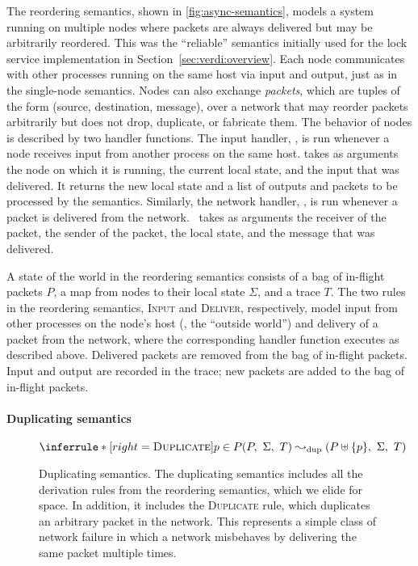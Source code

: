 The reordering semantics, shown in \cref{fig:async-semantics}, models a
system running on multiple nodes where packets are always delivered but
may be arbitrarily reordered.
%
This was the ``reliable'' semantics initially used for the lock
service implementation in Section~\ref{sec:verdi:overview}.
%
Each node communicates with other processes running on the same host via
input and output, just as in the single-node semantics.
%
Nodes can also exchange \textit{packets}, which are tuples of the form
(source, destination, message), over a network that may reorder
packets arbitrarily but does not drop, duplicate, or fabricate
them.
%
The behavior of nodes is described by two handler functions.
%
The input handler, \fHinp, is run whenever a node receives input from
another process on the same host.
%
\fHinp{} takes as arguments the node on which it is running, the current
local state, and the input that was delivered.
%
It returns the new local state and a list of outputs and packets to be
processed by the semantics.
%
Similarly, the network handler, \fHnet, is run whenever a packet
is delivered from the network.
%
\fHnet\ takes as arguments the receiver of the packet, the sender of the
packet, the local state, and the message that was delivered.

A state of the world in the reordering semantics consists of a bag of
in-flight packets $P$, a map from nodes to their local state $\Sigma$, and a
trace $T$.
%
The two rules in the reordering semantics, \textsc{Input} and
\textsc{Deliver}, respectively, model input from other processes on
the node's host (\ie, the ``outside world'') and delivery of a packet
from the network, where the corresponding handler function executes
as described above.
%
Delivered packets are removed from the bag of in-flight packets.
%
Input and output are recorded in the trace; new packets are added to the
bag of in-flight packets.

\paragraph{Duplicating semantics}

\begin{figure}[t]

  \begin{footnotesize} \begin{spacing}{1.5} \[
    \inferrule*[right=\textsc{Duplicate}]{
      p \in P
    }{
      (P,\ \Sigma,\ T) \fdupstep (P \uplus \{p\},\ \Sigma,\ T)
    }
  \] \end{spacing} \end{footnotesize}

  \caption{Duplicating semantics.
    The duplicating semantics includes all the derivation rules from
    the reordering semantics, which we elide for space. In addition,
    it includes the \textsc{Duplicate} rule, which duplicates an
    arbitrary packet in the network. This represents a simple class of
    network failure in which a network misbehaves by delivering the
    same packet multiple times.}

\label{fig:dupsem}
\end{figure}


